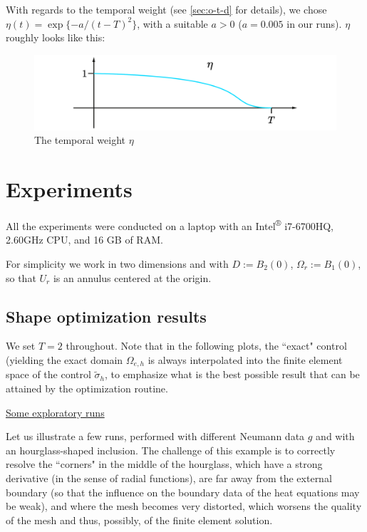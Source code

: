 \documentclass[english,a4paper,9pt,oneside]{scrbook}	%
\theoremstyle{break}
\theoremstyle{remark}
\begin{document}
With regards to the temporal weight (see \cref{sec:o-t-d} for details), we chose $\eta(t) = \exp\{-a/(t-T)^2\}$, with a suitable $a>0$ ($a=0.005$ in our runs). $\eta$ roughly looks like this:

\begin{figure}[H]
\centering
\includegraphics[width=0.5\columnwidth]{Images/Eta.pdf}
\caption{The temporal weight $\eta$}\label{fig:eta}
\end{figure}

\section{Experiments}
\label{sec:experiments}

All the experiments were conducted on a laptop with an Intel\textsuperscript{®} i7-6700HQ, 2.60GHz CPU, and 16 GB of RAM.

For simplicity we work in two dimensions and with $D:=B_2(0)$, $\Omega_r := B_{1}(0)$, so that $U_r$ is an annulus centered at the origin. 

\subsection{Shape optimization results}

We set $T=2$ throughout. Note that in the following plots, the ``exact" control (yielding the exact domain $\Omega_{e,h}$ is always interpolated into the finite element space of the control $\tilde{\sigma}_h$, to emphasize what is the best possible result that can be attained by the optimization routine.
%

\underline{Some exploratory runs}

Let us illustrate a few runs, performed with different Neumann data $g$ and with an hourglass-shaped inclusion. The challenge of this example is to correctly resolve the ``corners" in the middle of the hourglass, which have a strong derivative (in the sense of radial functions), are far away from the external boundary (so that the influence on the boundary data of the heat equations may be weak), and where the mesh becomes very distorted, which worsens the quality of the mesh and thus, possibly, of the finite element solution.
\end{document}

